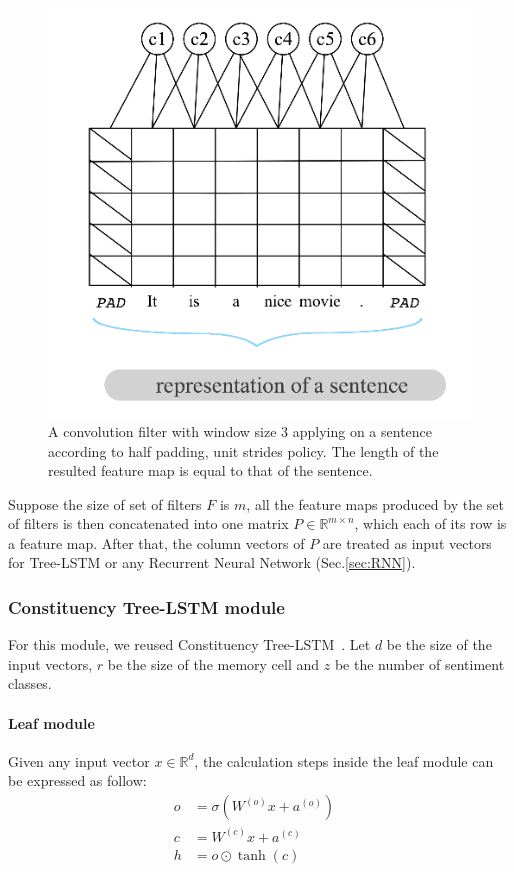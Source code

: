 \begin{figure}[H]
    \centering
\includegraphics[scale=0.45]{figure/half-padding}
    \caption[Half padding, unit strides policy]{A convolution filter with window size 3 applying on a sentence according to half padding, unit strides policy.
    The length of the resulted feature map is equal to that of the sentence.}
    \label{fig:half-padding}
\end{figure}

Suppose the size of set of filters \(F\) is \(m\), all the feature maps produced by the set of filters is then concatenated into one matrix \(P \in \mathbb{R}^{m \times n}\), which each of its row is a feature map.
After that, the column vectors of \(P\) are treated as input vectors for Tree-LSTM or any Recurrent Neural Network (Sec.\ref{sec:RNN}).

\subsubsection{Constituency Tree-LSTM module}
For this module, we reused Constituency Tree-LSTM~\cite{treeLSTM}.
Let \(d\) be the size of the input vectors, \(r
\) be the size of the memory cell and \(z\) be the number of sentiment classes. 

\paragraph{Leaf module}
Given any input vector \(x \in \mathbb{R}^d\), the calculation steps inside the leaf module can be expressed as follow:
\begin{align}
    o &= \sigma{\left( W^{(o)} x + a^{\left(o\right)}\right)} & \\
       c &= W^{(c)} x + a^{(c)} & \\
    h &= o \odot \tanh{\left(c\right)} &
\end{align}

